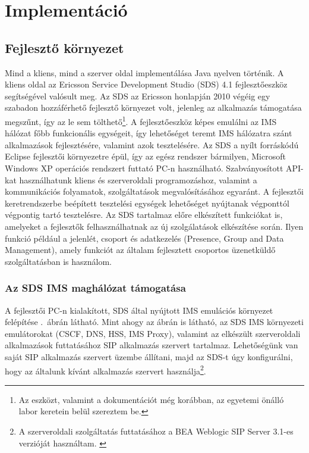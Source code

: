 \section{Implementáció}

\subsection{Fejlesztő környezet}

Mind a kliens, mind a szerver oldal implementálása Java nyelven történik. A kliens oldal az Ericsson Service Development Studio (SDS) 4.1 fejlesztőeszköz segítségével valósult meg. Az SDS az Ericsson honlapján 2010 végéig egy szabadon hozzáférhető fejlesztő környezet volt, jelenleg az alkalmazás támogatása megszűnt, így az le sem tölthető\footnote{Az eszközt, valamint a dokumentációt még korábban, az egyetemi önálló labor keretein belül szereztem be.}. A fejlesztőeszköz képes emulálni az IMS hálózat főbb funkcionális egységeit, így lehetőséget teremt IMS hálózatra szánt alkalmazások fejlesztésére, valamint azok tesztelésére. Az SDS a nyílt forráskódú Eclipse fejlesztői környezetre épül, így az egész rendszer bármilyen, Microsoft Windows XP operációs rendszert futtató PC-n használható. Szabványosított API-kat használhatunk kliens és szerveroldali programozáshoz, valamint a kommunikációs folyamatok, szolgáltatások megvalósításához egyaránt. A fejlesztői keretrendszerbe beépített tesztelési egységek lehetőséget nyújtanak végponttól végpontig tartó tesztelésre. Az SDS tartalmaz előre elkészített funkciókat is, amelyeket a fejlesztők felhasználhatnak az új szolgálatások elkészítése során. Ilyen funkció például a jelenlét, csoport és adatkezelés (Presence, Group and Data Management), amely funkciót az általam fejlesztett csoportos üzenetküldő szolgáltatásban is használom.

\subsubsection{Az SDS IMS maghálózat támogatása}

A fejlesztői PC-n kialakított, SDS által nyújtott IMS emulációs környezet felépítése .~ábrán  látható. Mint ahogy az ábrán is látható, az SDS IMS környezeti emulátorokat (CSCF, DNS, HSS, IMS Proxy), valamint az elkészült szerveroldali alkalmazások futtatásához SIP alkalmazás szervert tartalmaz. Lehetőségünk van saját SIP alkalmazás szervert üzembe állítani, majd az SDS-t úgy konfigurálni, hogy az általunk kívánt alkalmazás szervert használja\footnote{A szerveroldali szolgáltatás futtatásához a BEA Weblogic SIP Server 3.1-es verzióját használtam. \cite{bea_weblogic}}. 

